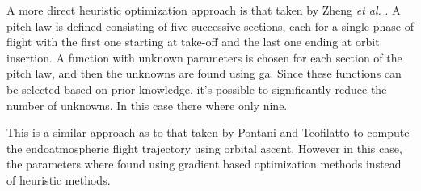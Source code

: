A more direct heuristic optimization approach is that taken by Zheng \emph{et al.} \cite{zheng2020ascent}. A pitch law is defined consisting of five successive sections, each for a single phase of flight with the first one starting at take-off and the last one ending at orbit insertion. A function with unknown parameters is chosen for each section of the pitch law, and then the unknowns are found using \acrfull{ga}. Since these functions can be selected based on prior knowledge, it's possible to significantly reduce the number of unknowns. In this case there where only nine.

This is a similar approach as to that taken by Pontani and Teofilatto \cite{pontani2014simple} to compute the endoatmospheric flight trajectory using orbital ascent. However in this case, the parameters where found using gradient based optimization methods instead of heuristic methods.



